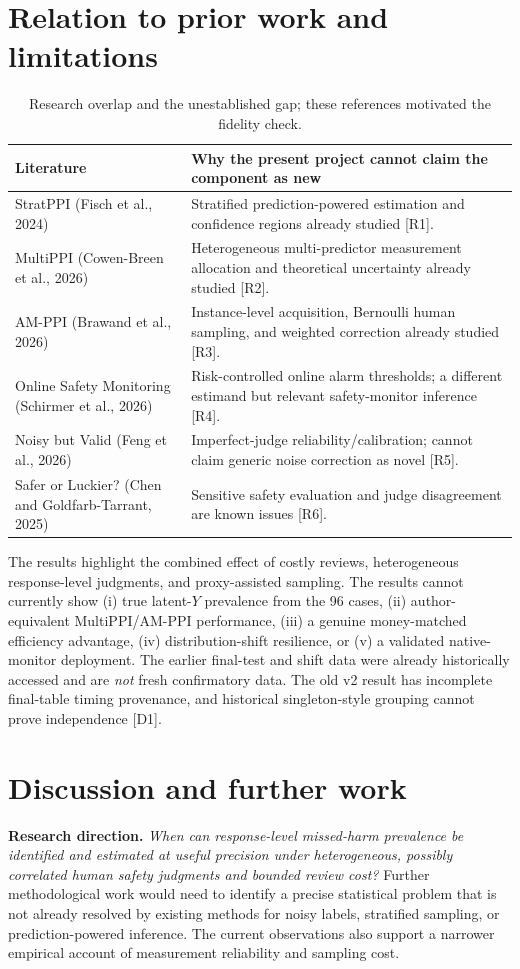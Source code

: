 \documentclass[11pt,a4paper]{article}
\begin{document}
\section{Relation to prior work and limitations}
\begin{table}[H]\centering\scriptsize
\caption{Research overlap and the unestablished gap; these references motivated the fidelity check.}
\begin{tabularx}{\textwidth}{@{}p{}X@{}}\toprule
Literature & Why the present project cannot claim the component as new\\\midrule
StratPPI (Fisch et al., 2024) & Stratified prediction-powered estimation and confidence regions already studied [R1].\\
MultiPPI (Cowen-Breen et al., 2026) & Heterogeneous multi-predictor measurement allocation and theoretical uncertainty already studied [R2].\\
AM-PPI (Brawand et al., 2026) & Instance-level acquisition, Bernoulli human sampling, and weighted correction already studied [R3].\\
Online Safety Monitoring (Schirmer et al., 2026) & Risk-controlled online alarm thresholds; a different estimand but relevant safety-monitor inference [R4].\\
Noisy but Valid (Feng et al., 2026) & Imperfect-judge reliability/calibration; cannot claim generic noise correction as novel [R5].\\
Safer or Luckier? (Chen and Goldfarb-Tarrant, 2025) & Sensitive safety evaluation and judge disagreement are known issues [R6].\\\bottomrule
\end{tabularx}
\end{table}
The results highlight the combined effect of costly reviews, heterogeneous response-level judgments, and proxy-assisted sampling. The results cannot currently show (i) true latent-$Y$ prevalence from the 96 cases, (ii) author-equivalent MultiPPI/AM-PPI performance, (iii) a genuine money-matched efficiency advantage, (iv) distribution-shift resilience, or (v) a validated native-monitor deployment. The earlier final-test and shift data were already historically accessed and are \emph{not} fresh confirmatory data. The old v2 result has incomplete final-table timing provenance, and historical singleton-style grouping cannot prove independence [D1].

\section{Discussion and further work}
\textbf{Research direction.} \emph{When can response-level missed-harm prevalence be identified and estimated at useful precision under heterogeneous, possibly correlated human safety judgments and bounded review cost?} Further methodological work would need to identify a precise statistical problem that is not already resolved by existing methods for noisy labels, stratified sampling, or prediction-powered inference. The current observations also support a narrower empirical account of measurement reliability and sampling cost.
\end{document}
